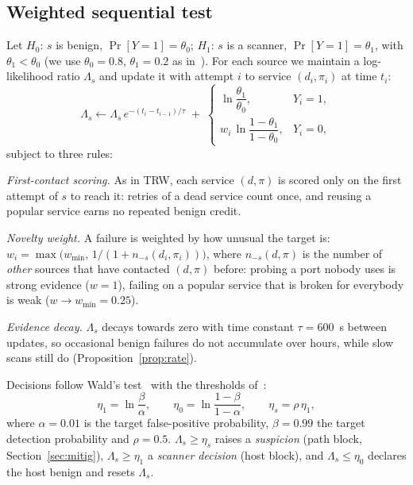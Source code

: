 \documentclass[conference]{IEEEtran}
\begin{document}
\subsection{Weighted sequential test}
Let $H_0$: $s$ is benign, $\Pr[Y=1]=\theta_0$; $H_1$: $s$ is a scanner, $\Pr[Y=1]=\theta_1$, with $\theta_1<\theta_0$
(we use $\theta_0=0.8$, $\theta_1=0.2$ as in~\cite{jung2004trw}). For each source we maintain a log-likelihood ratio
$\Lambda_s$ and update it with attempt $i$ to service $(d_i,\pi_i)$ at time $t_i$:
\begin{equation}\label{eq:update}
\Lambda_s \leftarrow \Lambda_s\, e^{-(t_i-t_{i-1})/\tau} \;+\;
\begin{cases} \ln\dfrac{\theta_1}{\theta_0}, & Y_i=1,\\[2mm] w_i\,\ln\dfrac{1-\theta_1}{1-\theta_0}, & Y_i=0,\end{cases}
\end{equation}
subject to three rules:

\emph{First-contact scoring.} As in TRW, each service $(d,\pi)$ is scored only on the first attempt of $s$ to reach it:
retries of a dead service count once, and reusing a popular service earns no repeated benign credit.

\emph{Novelty weight.} A failure is weighted by how unusual the target is:
$w_i = \max\!\big(w_{\min},\, 1/(1+n_{-s}(d_i,\pi_i))\big)$, where $n_{-s}(d,\pi)$ is the number of \emph{other} sources
that have contacted $(d,\pi)$ before: probing a port nobody uses is strong evidence ($w=1$), failing on a popular service
that is broken for everybody is weak ($w\to w_{\min}=0.25$).

\emph{Evidence decay.} $\Lambda_s$ decays towards zero with time constant $\tau=600$~s between updates, so occasional
benign failures do not accumulate over hours, while slow scans still do (Proposition~\ref{prop:rate}).

Decisions follow Wald's test~\cite{wald1945sequential} with the thresholds of~\cite{jung2004trw}:
\begin{equation}\label{eq:thresholds}
\eta_1=\ln\frac{\beta}{\alpha},\qquad \eta_0=\ln\frac{1-\beta}{1-\alpha},\qquad \eta_s=\rho\,\eta_1,
\end{equation}
where $\alpha=0.01$ is the target false-positive probability, $\beta=0.99$ the target detection probability and
$\rho=0.5$. $\Lambda_s\ge\eta_s$ raises a \emph{suspicion} (path block, Section~\ref{sec:mitig}), $\Lambda_s\ge\eta_1$ a
\emph{scanner decision} (host block), and $\Lambda_s\le\eta_0$ declares the host benign and resets $\Lambda_s$.
\end{document}
